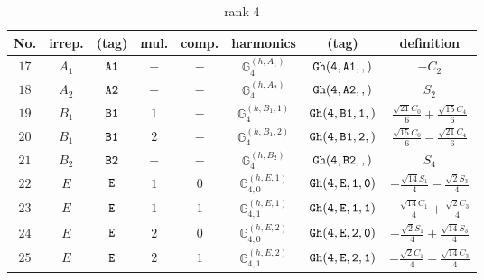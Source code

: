 \documentclass[fleqn,8pt]{jsarticle}
\begin{document}
\begin{table}[ht!]
\begin{center}
\caption{rank 4}
\renewcommand{\arraystretch}{1.3}
\begin{tabular}{cccccccc} \hline \hline
No. & irrep. & (tag) & mul. & comp. & harmonics & (tag) & definition \\ \hline
$ 17 $ & $ A_{1} $ & $ {\tt A1} $ & $ - $ & $ - $ & $ \mathbb{G}_{4}^{(h,A_{1})} $ & $ {\tt Gh(4,A1,,)} $ & $ - C_{2} $ \\
$ 18 $ & $ A_{2} $ & $ {\tt A2} $ & $ - $ & $ - $ & $ \mathbb{G}_{4}^{(h,A_{2})} $ & $ {\tt Gh(4,A2,,)} $ & $ S_{2} $ \\
$ 19 $ & $ B_{1} $ & $ {\tt B1} $ & $ 1 $ & $ - $ & $ \mathbb{G}_{4}^{(h,B_{1},1)} $ & $ {\tt Gh(4,B1,1,)} $ & $ \frac{\sqrt{21} C_{0}}{6} + \frac{\sqrt{15} C_{4}}{6} $ \\
$ 20 $ & $ B_{1} $ & $ {\tt B1} $ & $ 2 $ & $ - $ & $ \mathbb{G}_{4}^{(h,B_{1},2)} $ & $ {\tt Gh(4,B1,2,)} $ & $ \frac{\sqrt{15} C_{0}}{6} - \frac{\sqrt{21} C_{4}}{6} $ \\
$ 21 $ & $ B_{2} $ & $ {\tt B2} $ & $ - $ & $ - $ & $ \mathbb{G}_{4}^{(h,B_{2})} $ & $ {\tt Gh(4,B2,,)} $ & $ S_{4} $ \\
$ 22 $ & $ E $ & $ {\tt E} $ & $ 1 $ & $ 0 $ & $ \mathbb{G}_{4,0}^{(h,E,1)} $ & $ {\tt Gh(4,E,1,0)} $ & $ - \frac{\sqrt{14} S_{1}}{4} - \frac{\sqrt{2} S_{3}}{4} $ \\
$ 23 $ & $ E $ & $ {\tt E} $ & $ 1 $ & $ 1 $ & $ \mathbb{G}_{4,1}^{(h,E,1)} $ & $ {\tt Gh(4,E,1,1)} $ & $ - \frac{\sqrt{14} C_{1}}{4} + \frac{\sqrt{2} C_{3}}{4} $ \\
$ 24 $ & $ E $ & $ {\tt E} $ & $ 2 $ & $ 0 $ & $ \mathbb{G}_{4,0}^{(h,E,2)} $ & $ {\tt Gh(4,E,2,0)} $ & $ - \frac{\sqrt{2} S_{1}}{4} + \frac{\sqrt{14} S_{3}}{4} $ \\
$ 25 $ & $ E $ & $ {\tt E} $ & $ 2 $ & $ 1 $ & $ \mathbb{G}_{4,1}^{(h,E,2)} $ & $ {\tt Gh(4,E,2,1)} $ & $ - \frac{\sqrt{2} C_{1}}{4} - \frac{\sqrt{14} C_{3}}{4} $ \\
 \hline \hline
\end{tabular}
\end{center}
\end{table}
\end{document}
